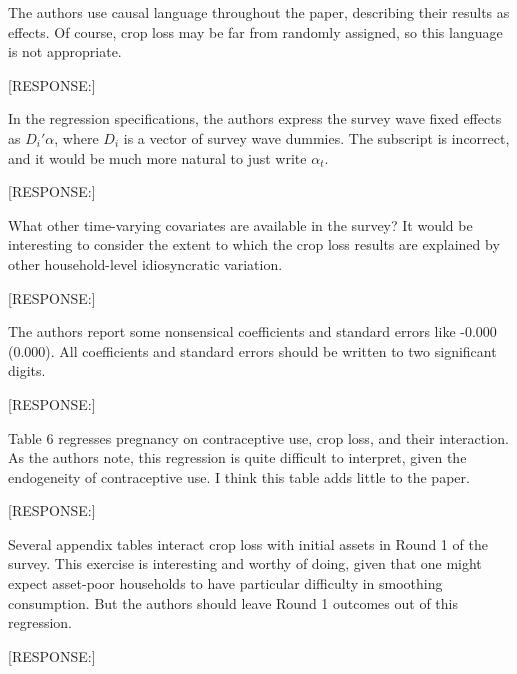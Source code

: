 \documentclass[letterpaper,12pt]{article}
\begin{document}
\begin{description}
[RESPONSE:]

\item The authors use causal language throughout the paper, describing
their results as effects. Of course, crop loss may be far from randomly
assigned, so this language is not appropriate.

[RESPONSE:]

\item In the regression specifications, the authors express the survey
wave fixed effects as $D_{i}'\alpha$, where $D_{i}$ is a vector of survey
wave dummies. The subscript is incorrect, and it would be much more
natural to just write $\alpha_{t}$.

[RESPONSE:]

\item What other time-varying covariates are available in the survey? It
would be interesting to consider the extent to which the crop loss
results are explained by other household-level idiosyncratic variation.

[RESPONSE:]

\item The authors report some nonsensical coefficients and standard
errors like -0.000 (0.000). All coefficients and standard errors should
be written to two significant digits.

[RESPONSE:]

\item Table 6 regresses pregnancy on contraceptive use, crop loss, and
their interaction. As the authors note, this regression is quite
difficult to interpret, given the endogeneity of contraceptive use. I
think this table adds little to the paper.

[RESPONSE:]

\item Several appendix tables interact crop loss with initial assets in
Round 1 of the survey. This exercise is interesting and worthy of doing,
given that one might expect asset-poor households to have particular
difficulty in smoothing consumption. But the authors should leave Round
1 outcomes out of this regression.

[RESPONSE:]


\end{description}

\end{document}
